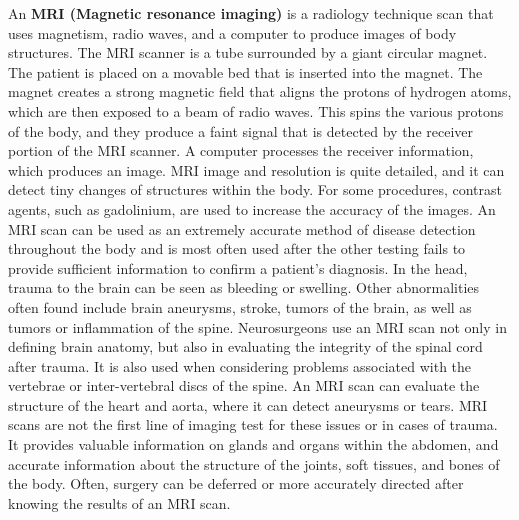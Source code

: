 An \textbf{  MRI (Magnetic resonance imaging) } is a radiology technique scan that uses magnetism, radio waves, and a computer to produce images of body structures. The MRI scanner is a tube surrounded by a giant circular magnet. The patient is placed on a movable bed that is inserted into the magnet. The magnet creates a strong magnetic field that aligns the protons of hydrogen atoms, which are then exposed to a beam of radio waves. This spins the various protons of the body, and they produce a faint signal that is detected by the receiver portion of the MRI scanner. A computer processes the receiver information, which produces an image.
MRI image and resolution is quite detailed, and it can detect tiny changes of structures within the body. For some procedures, contrast agents, such as gadolinium, are used to increase the accuracy of the images. \newline  An MRI scan can be used as an extremely accurate method of disease detection throughout the body and is most often used after the other testing fails to provide sufficient information to confirm a patient's diagnosis. In the head, trauma to the brain can be seen as bleeding or swelling. Other abnormalities often found include brain aneurysms, stroke, tumors of the brain, as well as tumors or inflammation of the spine.  \newline Neurosurgeons use an MRI scan not only in defining brain anatomy, but also in evaluating the integrity of the spinal cord after trauma. It is also used when considering problems associated with the vertebrae or inter-vertebral discs of the spine. An MRI scan can evaluate the structure of the heart and aorta, where it can detect aneurysms or tears. MRI scans are not the first line of imaging test for these issues or in cases of trauma.  \newline It provides valuable information on glands and organs within the abdomen, and accurate information about the structure of the joints, soft tissues, and bones of the body. Often, surgery can be deferred or more accurately directed after knowing the results of an MRI scan.

